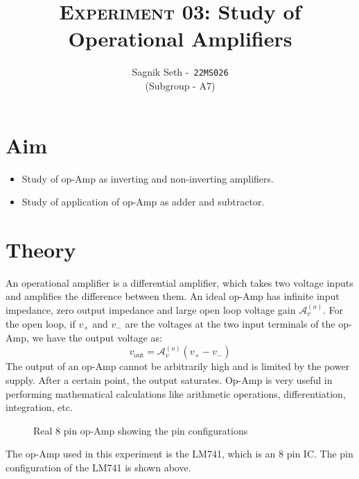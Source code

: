 \documentclass{scrartcl}
\title{
        \Large\textsc{Experiment 03: }
        \huge\textbf{Study of Operational Amplifiers} \\
}
\author{{\Large Sagnik Seth} -\   \texttt{22MS026}\\ ({\small Subgroup - A7}) }
\date{}
\begin{document}
\maketitle
\section{Aim}
\begin{itemize}
    \item Study of op-Amp as inverting and non-inverting amplifiers.
    \item Study of application of op-Amp as adder and subtractor.
\end{itemize}
\section{Theory}
An operational amplifier is a differential amplifier, which takes two voltage inputs and amplifies the difference between them. An ideal op-Amp has infinite input impedance, zero output impedance and large open loop voltage gain $\mathcal{A}_v^{(o)}$. For the open loop, if $v_+$ and $v_-$ are the voltages at the two input terminals of the op-Amp, we have the output voltage as: $$v_{\text{out}} = \mathcal{A}_v^{(o)}(v_+-v_-)$$
The output of an op-Amp cannot be arbitrarily high and is limited by the power supply. After a certain point, the output saturates. Op-Amp is very useful in performing mathematical calculations like arithmetic operations, differentiation, integration, etc.  
\begin{figure}[H]
    \centering
    
    \caption{Real 8 pin op-Amp showing the pin configurations}
\end{figure}
\noindent 
The op-Amp used in this experiment is the LM741, which is an 8 pin IC. The pin configuration of the LM741 is shown above.\\[0.3cm]




\end{document}
